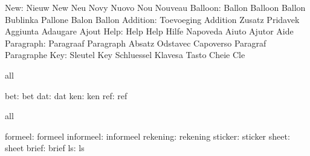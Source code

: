                       New: Nieuw                     New
                           Neu                       Novy
                           Nuovo                     Nou
                           Nouveau
                  Balloon: Ballon                    Balloon
                           Ballon                    Bublinka
                           Pallone                   Balon
                           Ballon
                 Addition: Toevoeging                Addition
                           Zusatz                    Pridavek
                           Aggiunta                  Adaugare
                           Ajout
                     Help: Help                      Help
                           Hilfe                     Napoveda
                           Aiuto                     Ajutor
                           Aide
                Paragraph: Paragraaf                 Paragraph
                           Absatz                    Odstavec
                           Capoverso                 Paragraf
                           Paragraphe
                      Key: Sleutel                   Key
                           Schluessel                Klavesa
                           Tasto                     Cheie
                           Cle
\stopvariables




\startconstants            all

                      bet: bet
                      dat: dat
                      ken: ken
                      ref: ref

\stopconstants

\startvariables            all

                  formeel: formeel
                informeel: informeel
                 rekening: rekening
                  sticker: sticker
                    sheet: sheet
                    brief: brief
                       ls: ls

\stopvariables

\stoplogginginterface

\endinput
